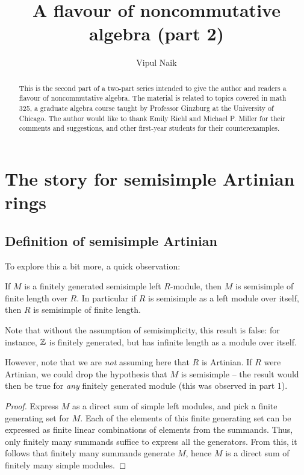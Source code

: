 \documentclass[a4paper]{amsart}
\title{A flavour of noncommutative algebra (part 2)}
\author{Vipul Naik}
\begin{document}
\maketitle

\begin{abstract}
  This is the second part of a two-part series intended to give the
  author and readers a flavour of noncommutative algebra. The material
  is related to topics covered in math 325, a graduate algebra course
  taught by Professor Ginzburg at the University of Chicago. The
  author would like to thank Emily Riehl and Michael P. Miller for
  their comments and suggestions, and other first-year students for
  their counterexamples.
\end{abstract}

\section{The story for semisimple Artinian rings}

\subsection{Definition of semisimple Artinian}

\begin{definer}
\end{definer}

To explore this a bit more, a quick observation:

\begin{claimer}
  If $M$ is a finitely generated semisimple left $R$-module,
  then $M$ is semisimple of finite length over $R$. In particular if
  $R$ is semisimple as a left module over itself, then $R$ is
  semisimple of finite length.
\end{claimer}

Note that without the assumption of semisimplicity, this result is
false: for instance, $\mathbb{Z}$ is finitely generated, but has infinite
length as a module over itself.

However, note that we are {\em not} assuming here that $R$ is
Artinian.  If $R$ were Artinian, we could drop the hypothesis that $M$
is semisimple -- the result would then be true for {\em any} finitely
generated module (this was observed in part 1).

\begin{proof}
  Express $M$ as a direct sum of simple left modules, and pick a
  finite generating set for $M$. Each of the elements of this finite
  generating set can be expressed as finite linear combinations of
  elements from the summands. Thus, only finitely many summands
  suffice to express all the generators. From this, it follows that
  finitely many summands generate $M$, hence $M$ is a direct sum of
  finitely many simple modules.
\end{proof}
\end{document}
